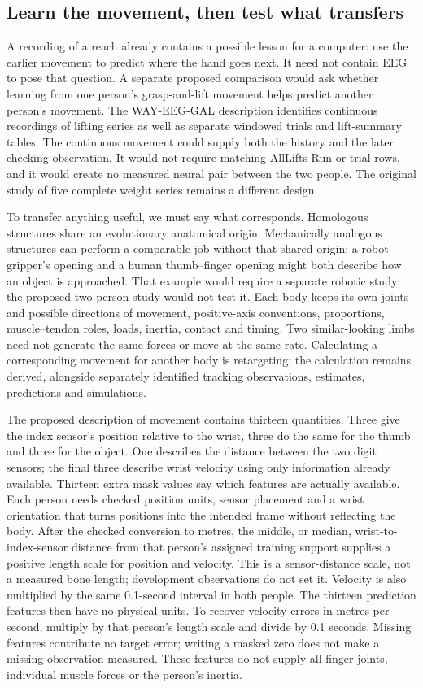 \subsection{Learn the movement, then test what transfers}

A recording of a reach already contains a possible lesson for a computer: use the earlier movement to predict where the hand goes next. It need not contain EEG to pose that question. A separate proposed comparison would ask whether learning from one person's grasp-and-lift movement helps predict another person's movement. The WAY-EEG-GAL description identifies continuous recordings of lifting series as well as separate windowed trials and lift-summary tables.\citep{luciw2014way} The continuous movement could supply both the history and the later checking observation. It would not require matching AllLifts Run or trial rows, and it would create no measured neural pair between the two people. The original study of five complete weight series remains a different design.

To transfer anything useful, we must say what corresponds. Homologous structures share an evolutionary anatomical origin. Mechanically analogous structures can perform a comparable job without that shared origin: a robot gripper's opening and a human thumb--finger opening might both describe how an object is approached. That example would require a separate robotic study; the proposed two-person study would not test it. Each body keeps its own joints and possible directions of movement, positive-axis conventions, proportions, muscle--tendon roles, loads, inertia, contact and timing. Two similar-looking limbs need not generate the same forces or move at the same rate. Calculating a corresponding movement for another body is retargeting; the calculation remains derived, alongside separately identified tracking observations, estimates, predictions and simulations.

The proposed description of movement contains thirteen quantities. Three give the index sensor's position relative to the wrist, three do the same for the thumb and three for the object. One describes the distance between the two digit sensors; the final three describe wrist velocity using only information already available. Thirteen extra mask values say which features are actually available. Each person needs checked position units, sensor placement and a wrist orientation that turns positions into the intended frame without reflecting the body. After the checked conversion to metres, the middle, or median, wrist-to-index-sensor distance from that person's assigned training support supplies a positive length scale for position and velocity. This is a sensor-distance scale, not a measured bone length; development observations do not set it. Velocity is also multiplied by the same 0.1-second interval in both people. The thirteen prediction features then have no physical units. To recover velocity errors in metres per second, multiply by that person's length scale and divide by 0.1 seconds. Missing features contribute no target error; writing a masked zero does not make a missing observation measured. These features do not supply all finger joints, individual muscle forces or the person's inertia.

